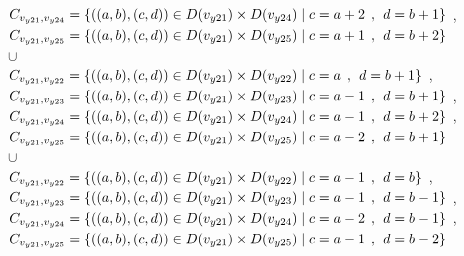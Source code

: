 \\$C_{v_{y21},v_{y24}}=\{((a,b),(c,d))\in D(v_{y21}) \times D(v_{y24})\mid c = a + 2\hspace{1ex} , \hspace{1ex}  d = b + 1 \}$ , 
\\$C_{v_{y21},v_{y25}}=\{((a,b),(c,d))\in D(v_{y21}) \times D(v_{y25})\mid c = a + 1\hspace{1ex} , \hspace{1ex}  d = b + 2 \}$  
\\$\cup$
\\$C_{v_{y21},v_{y22}}=\{((a,b),(c,d))\in D(v_{y21}) \times D(v_{y22})\mid c = a  \hspace{1ex} , \hspace{1ex}  d = b + 1 \}$ , 
\\$C_{v_{y21},v_{y23}}=\{((a,b),(c,d))\in D(v_{y21}) \times D(v_{y23})\mid c = a - 1\hspace{1ex} , \hspace{1ex}  d = b + 1 \}$ , 
\\$C_{v_{y21},v_{y24}}=\{((a,b),(c,d))\in D(v_{y21}) \times D(v_{y24})\mid c = a - 1\hspace{1ex} , \hspace{1ex}  d = b + 2 \}$ , 
\\$C_{v_{y21},v_{y25}}=\{((a,b),(c,d))\in D(v_{y21}) \times D(v_{y25})\mid c = a - 2\hspace{1ex} , \hspace{1ex}  d = b + 1 \}$  
\\$\cup$
\\$C_{v_{y21},v_{y22}}=\{((a,b),(c,d))\in D(v_{y21}) \times D(v_{y22})\mid c = a - 1\hspace{1ex} , \hspace{1ex}  d = b   \}$ , 
\\$C_{v_{y21},v_{y23}}=\{((a,b),(c,d))\in D(v_{y21}) \times D(v_{y23})\mid c = a - 1\hspace{1ex} , \hspace{1ex}  d = b - 1 \}$ , 
\\$C_{v_{y21},v_{y24}}=\{((a,b),(c,d))\in D(v_{y21}) \times D(v_{y24})\mid c = a - 2\hspace{1ex} , \hspace{1ex}  d = b - 1 \}$ , 
\\$C_{v_{y21},v_{y25}}=\{((a,b),(c,d))\in D(v_{y21}) \times D(v_{y25})\mid c = a - 1\hspace{1ex} , \hspace{1ex}  d = b - 2 \}$  
